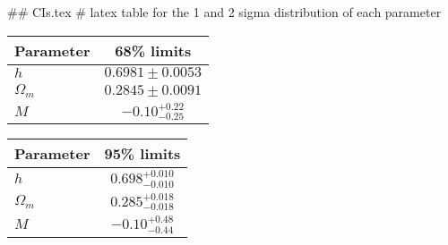 ## CIs.tex
# latex table for the 1 and 2 sigma distribution of each parameter

\begin{tabular} { l  c}
 Parameter &  68\% limits\\
\hline
{\boldmath$h              $} & $0.6981\pm 0.0053          $\\
{\boldmath$\Omega_m       $} & $0.2845\pm 0.0091          $\\
{\boldmath$M              $} & $-0.10^{+0.22}_{-0.25}     $\\
\hline
\end{tabular}

\begin{tabular} { l  c}
 Parameter &  95\% limits\\
\hline
{\boldmath$h              $} & $0.698^{+0.010}_{-0.010}   $\\
{\boldmath$\Omega_m       $} & $0.285^{+0.018}_{-0.018}   $\\
{\boldmath$M              $} & $-0.10^{+0.48}_{-0.44}     $\\
\hline
\end{tabular}
